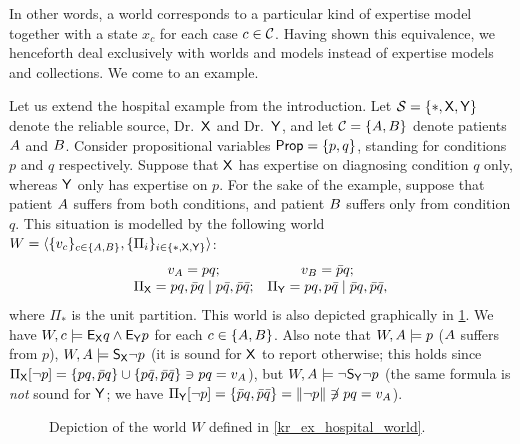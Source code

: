 In other words, a world corresponds to a particular kind of expertise model
together with a state $x_c$ for each case $c \in \mathcal{C}$. Having shown this
equivalence, we henceforth deal exclusively with worlds and models instead of
expertise models and collections. We come to an example.

\begin{example}
    \label{kr_ex_hospital_world}
    Let us extend the hospital example from the introduction. Let $\mathcal{S} =
    \{\ast, \mathsf{X}, \mathsf{Y}\}$ denote the reliable source, Dr.\ $\mathsf{X}$ and Dr.\
    $\mathsf{Y}$, and let $\mathcal{C} = \{A, B\}$ denote patients $A$
    and $B$. Consider propositional variables $\mathsf{Prop} = \{p, q\}$,
    standing for conditions $p$ and $q$ respectively. Suppose that $\mathsf{X}$ has
    expertise on diagnosing condition $q$ only, whereas $\mathsf{Y}$ only has
    expertise on $p$. For the sake of the example, suppose that patient
    $A$ suffers from both conditions, and patient $B$ suffers
    only from condition $q$. This situation is modelled by the following world
    $W = \langle {\{v_c\}_{c \in \{A, B\}}, \{\Pi_i\}_{i \in
    \{\ast, \mathsf{X}, \mathsf{Y}\}}} \rangle$:
    \[
        \begin{array}{cc}
            v_{A} = pq;
            &
            v_{B} = \bar{p}q;
            \\
            \Pi_{\mathsf{X}} = pq, \bar{p}q \mid p\bar{q}, \bar{p}\bar{q};
            &
            \Pi_{\mathsf{Y}} = pq, p\bar{q} \mid \bar{p}q, \bar{p}\bar{q},
        \end{array}
    \]
    where $\Pi_\ast$ is the unit partition. This world is also depicted
    graphically in \cref{kr_fig_example_world}.
    We have $W, c \models \mathsf{E}_{\mathsf{X}} q \land \mathsf{E}_{\mathsf{Y}} p$ for each $c \in
    \{A, B\}$. Also note that $W, A \models p$
    ($A$ suffers from $p$), $W, A \models \mathsf{S}_{\mathsf{X}}{\neg p}$
    (it is sound for $\mathsf{X}$ to report otherwise; this holds since
    $\Pi_{\mathsf{X}}[\neg p] = \{pq, \bar{p}q\} \cup \{p\bar{q}, \bar{p}\bar{q}\}
    \ni pq = v_{A}$), but $W, A \models \neg \mathsf{S}_{\mathsf{Y}}{\neg p}$
    (the same formula is \emph{not} sound for $\mathsf{Y}$; we have $\Pi_{\mathsf{Y}}[\neg
    p] = \{\bar{p}q, \bar{p}\bar{q}\} = \|{\neg p}\| \not\ni pq =
    v_{A}$).
\end{example}

\begin{figure}
    \centering
    
    \caption{
        Depiction of the world $W$ defined in \cref{kr_ex_hospital_world}.
    }
    \label{kr_fig_example_world}
\end{figure}


